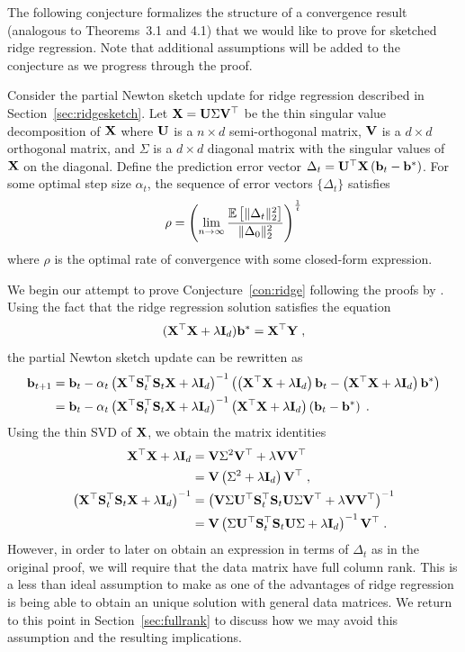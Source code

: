 The following conjecture formalizes the structure of a convergence result (analogous to Theorems~3.1 and 4.1) that we would like to prove for sketched ridge regression. Note that additional assumptions will be added to the conjecture as we progress through the proof.

\begin{conjecture} \label{con:ridge}
Consider the partial Newton sketch update for ridge regression described in Section~\ref{sec:ridgesketch}. Let $\mathbf{X} = \mathbf{U}\Sigma\mathbf{V}^\top$ be the thin singular value decomposition of $\mathbf{X}$ where $\mathbf{U}$ is a $n\times d$ semi-orthogonal matrix, $\mathbf{V}$ is a $d\times d$ orthogonal matrix, and $\Sigma$ is a $d\times d$ diagonal matrix with the singular values of $\mathbf{X}$ on the diagonal. Define the prediction error vector $\Delta_t=\mathbf{U}^\top\mathbf{X}\left(\mathbf{b}_t-\mathbf{b}^*\right)$. For some optimal step size $\alpha_t$, the sequence of error vectors $\{\Delta_t\}$ satisfies
\[
\rho = \left(\lim_{n\rightarrow\infty}\frac{\mathbb{E}\left[\|\Delta_t\|_2^2\right]}{\|\Delta_0\|_2^2}\right)^\frac{1}{t}
\]
where $\rho$ is the optimal rate of convergence with some closed-form expression.
\end{conjecture}

We begin our attempt to prove Conjecture~\ref{con:ridge} following the proofs by \citet{Lacotte:2020}. Using the fact that the ridge regression solution satisfies the equation
\[
(\mathbf{X}^\top\mathbf{X} + \lambda\mathbf{I}_d)\mathbf{b}^* = \mathbf{X}^\top\mathbf{Y} \;,
\]
the partial Newton sketch update can be rewritten as
\begin{align*}
\mathbf{b}_{t+1} &= \mathbf{b}_t - \alpha_t\left(\mathbf{X}^\top\mathbf{S}_t^\top\mathbf{S}_t\mathbf{X} + \lambda\mathbf{I}_d\right)^{-1}\left(\left(\mathbf{X}^\top\mathbf{X}+\lambda\mathbf{I}_d\right)\mathbf{b}_t-\left(\mathbf{X}^\top\mathbf{X}+\lambda\mathbf{I}_d\right)\mathbf{b}^*\right) \\
&= \mathbf{b}_t - \alpha_t\left(\mathbf{X}^\top\mathbf{S}_t^\top\mathbf{S}_t\mathbf{X} + \lambda\mathbf{I}_d\right)^{-1}\left(\mathbf{X}^\top\mathbf{X}+\lambda\mathbf{I}_d\right)\left(\mathbf{b}_t-\mathbf{b}^*\right) \;.
\end{align*}
Using the thin SVD of $\mathbf{X}$, we obtain the matrix identities
\begin{align*}
\mathbf{X}^\top\mathbf{X}+\lambda\mathbf{I}_d &= \mathbf{V}\Sigma^2\mathbf{V}^\top + \lambda \mathbf{V}\mathbf{V}^\top \\
&= \mathbf{V}\left(\Sigma^2+ \lambda\mathbf{I}_d\right)\mathbf{V}^\top \;, \\
\left(\mathbf{X}^\top\mathbf{S}_t^\top\mathbf{S}_t\mathbf{X} + \lambda\mathbf{I}_d\right)^{-1} &= \left(\mathbf{V}\Sigma\mathbf{U}^\top\mathbf{S}_t^\top\mathbf{S}_t\mathbf{U}\Sigma\mathbf{V}^\top + \lambda\mathbf{V}\mathbf{V}^\top\right)^{-1} \\
&= \mathbf{V}\left(\Sigma\mathbf{U}^\top\mathbf{S}_t^\top\mathbf{S}_t\mathbf{U}\Sigma + \lambda\mathbf{I}_d\right)^{-1}\mathbf{V}^\top \;.
\end{align*}
However, in order to later on obtain an expression in terms of $\Delta_t$ as in the original proof, we will require that the data matrix have full column rank. This is a less than ideal assumption to make as one of the advantages of ridge regression is being able to obtain an unique solution with general data matrices. We return to this point in Section~\ref{sec:fullrank} to discuss how we may avoid this assumption and the resulting implications.

